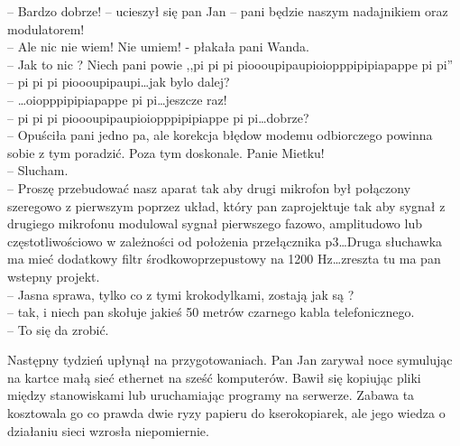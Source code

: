 \documentclass[a4paper,polish,titlepage,12pt]{article}
\begin{document}
-- Bardzo dobrze! -- ucieszył się pan Jan -- pani będzie naszym nadajnikiem oraz modulatorem!\\
-- Ale nic nie wiem! Nie umiem! - płakała pani Wanda.\\
-- Jak to nic ? Niech pani powie ,,pi pi pi pioooupipaupioiopppipipiapappe pi pi''\\
-- pi pi pi pioooupipaupi\dots jak bylo dalej?\\
-- \dots oiopppipipiapappe pi pi\dots jeszcze raz!\\
-- pi pi pi pioooupipaupioiopppipipiappe pi pi\dots dobrze?\\
-- Opuściła pani jedno pa, ale korekcja błędow modemu odbiorczego powinna sobie z tym poradzić. Poza tym doskonale. Panie Mietku!\\
-- Slucham.\\
-- Proszę przebudować nasz aparat tak aby drugi mikrofon był połączony szeregowo z pierwszym poprzez układ, który pan zaprojektuje tak aby sygnał z
drugiego mikrofonu modulowal sygnał pierwszego fazowo, amplitudowo lub częstotliwościowo w zależności od położenia przełącznika p3\dots Druga słuchawka
 ma mieć dodatkowy filtr środkowoprzepustowy na 1200 Hz\dots zreszta tu ma pan wstepny projekt.\\
-- Jasna sprawa, tylko co z tymi krokodylkami, zostają jak są ?\\
-- tak, i niech pan skołuje jakieś 50 metrów czarnego kabla telefonicznego.\\
-- To się da zrobić.

Następny tydzień upłynął na przygotowaniach. Pan Jan zarywał noce symulując na kartce małą sieć ethernet na sześć komputerów. Bawił się kopiując pliki między stanowiskami lub
uruchamiając programy na serwerze. Zabawa ta kosztowala go co prawda dwie ryzy papieru do kserokopiarek, ale jego wiedza o działaniu sieci wzrosła niepomiernie.
\end{document}
